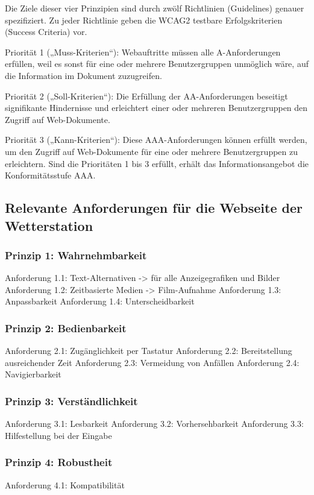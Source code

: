 Die Ziele dieser vier Prinzipien sind durch zwölf Richtlinien (Guidelines) genauer spezifiziert. Zu jeder Richtlinie geben die WCAG2 testbare Erfolgskriterien (Success Criteria) vor.

Priorität 1 („Muss-Kriterien“): Webauftritte müssen alle A-Anforderungen erfüllen, weil es sonst für eine oder mehrere Benutzergruppen unmöglich wäre, auf die Information im Dokument zuzugreifen.

Priorität 2 („Soll-Kriterien“): Die Erfüllung der AA-Anforderungen beseitigt signifikante Hindernisse und erleichtert einer oder mehreren Benutzergruppen den Zugriff auf Web-Dokumente.

Priorität 3 („Kann-Kriterien“): Diese AAA-Anforderungen können erfüllt werden, um den Zugriff auf Web-Dokumente für eine oder mehrere Benutzergruppen zu erleichtern. Sind die Prioritäten 1 bis 3 erfüllt, erhält das Informationsangebot die Konformitätsstufe AAA.

\subsection{Relevante Anforderungen für die Webseite der Wetterstation}

\subsubsection*{Prinzip 1: Wahrnehmbarkeit}
Anforderung 1.1: Text-Alternativen 
-> für alle Anzeigegrafiken und Bilder
Anforderung 1.2: Zeitbasierte Medien 
-> Film-Aufnahme
Anforderung 1.3: Anpassbarkeit
Anforderung 1.4: Unterscheidbarkeit


\subsubsection*{Prinzip 2: Bedienbarkeit}
Anforderung 2.1: Zugänglichkeit per Tastatur
Anforderung 2.2: Bereitstellung ausreichender Zeit
Anforderung 2.3: Vermeidung von Anfällen
Anforderung 2.4: Navigierbarkeit


\subsubsection*{Prinzip 3: Verständlichkeit}
Anforderung 3.1: Lesbarkeit
Anforderung 3.2: Vorhersehbarkeit
Anforderung 3.3: Hilfestellung bei der Eingabe

\subsubsection*{Prinzip 4: Robustheit}
Anforderung 4.1: Kompatibilität


